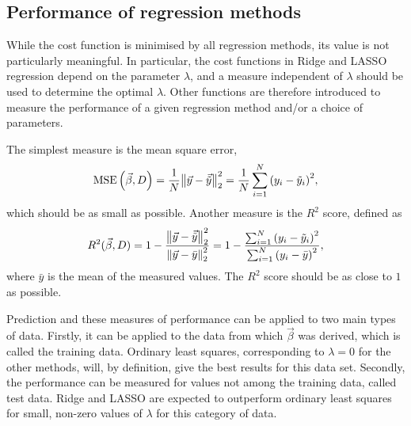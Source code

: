 \documentclass[11pt,british,a4paper]{article}
\DeclareMathOperator{\MSE}{MSE}
\numberwithin{equation}{section}
\begin{document}
\subsection{Performance of regression methods}
While the cost function is minimised by all regression methods, its value is not particularly meaningful.
In particular, the cost functions in Ridge and LASSO regression depend on the parameter \(\lambda\), and a measure independent of \(\lambda\) should be used to determine the optimal \(\lambda\).
Other functions are therefore introduced to measure the performance of a given regression method and/or a choice of parameters.

The simplest measure is the mean square error,
\begin{equation}
    \MSE\qty(\vec{\beta},D) = \frac{1}{N}\norm{\vec{y}-\vec{\tilde{y}}}_2^2 = \frac{1}{N} \sum_{i=1}^N \qty(y_i - \tilde{y}_i)^2,
\end{equation}
which should be as small as possible. Another measure is the \(R^2\) score, defined as
\begin{equation}
    R^2(\vec{\beta},D) = 1 - \frac{\norm{\vec{y} - \vec{\tilde{y}}}_2^2}{\norm{\vec{y} - \bar{y}}_2^2}
                       = 1 - \frac{\sum_{i=1}^N \qty(y_i - \tilde{y}_i)^2}{\sum_{i=1}^N \qty(y_i - \bar{y})^2},
\end{equation}
where \(\bar{y}\) is the mean of the measured values. The \(R^2\) score should be as close to \(1\) as possible.

Prediction and these measures of performance can be applied to two main types of data.
Firstly, it can be applied to the data from which \(\vec{\beta}\) was derived, which is called the training data.
Ordinary least squares, corresponding to \(\lambda=0\) for the other methods, will, by definition, give the best results for this data set.
Secondly, the performance can be measured for values not among the training data, called test data. Ridge and LASSO are expected to outperform ordinary least squares for small, non-zero values of \(\lambda\) for this category of data.

\end{document}
